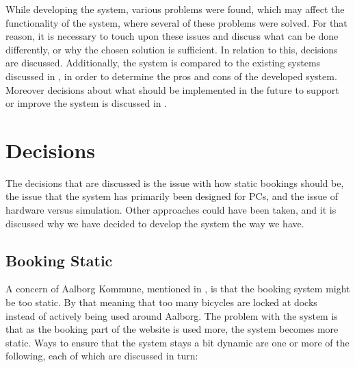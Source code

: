 While developing the system, various problems were found, which may affect the functionality of the system, where several of these problems were solved.
For that reason, it is necessary to touch upon these issues and discuss what can be done differently, or why the chosen solution is sufficient.
In relation to this, decisions are discussed.
Additionally, the system is compared to the existing systems discussed in , in order to determine the pros and cons of the developed system.
Moreover decisions about what should be implemented in the future to support or improve the system is discussed in .

\section{Decisions}
The decisions that are discussed is the issue with how static bookings should be, the issue that the system has primarily been designed for PCs, and the issue of hardware versus simulation.
Other approaches could have been taken, and it is discussed why we have decided to develop the system the way we have.

\subsection{Booking Static}
A concern of Aalborg Kommune, mentioned in , is that the booking system might be too static.
By that meaning that too many bicycles are locked at docks instead of actively being used around Aalborg.
The problem with the system is that as the booking part of the website is used more, the system becomes more static.
Ways to ensure that the system stays a bit dynamic are one or more of the following, each of which are discussed in turn:

